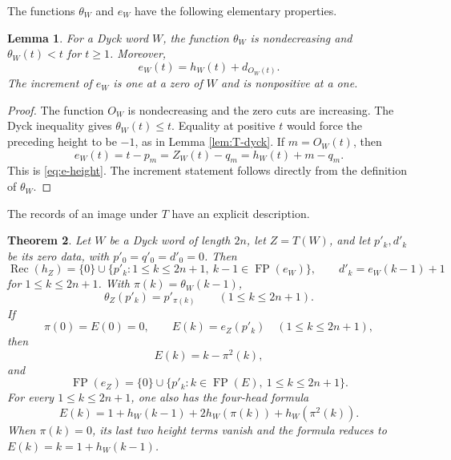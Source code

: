 \documentclass[11pt]{article}
\newtheorem{theorem}{Theorem}[section]
\newtheorem{lemma}[theorem]{Lemma}
\theoremstyle{definition}
\theoremstyle{remark}
\DeclareMathOperator{\Rec}{Rec}
\DeclareMathOperator{\FP}{FP}
\begin{document}
The functions $\theta_W$ and $e_W$ have the following elementary properties.
\begin{lemma}
\label{lem:theta-e}
For a Dyck word \(W\), the function \(\theta_W\) is nondecreasing and
\(\theta_W(t)<t\) for \(t\geq1\).  Moreover,
\begin{equation}
\label{eq:e-height}
 e_W(t)=h_W(t)+d_{O_W(t)}.
\end{equation}
The increment of \(e_W\) is one at a zero of \(W\) and is nonpositive at a
one.
\end{lemma}

\begin{proof}
The function \(O_W\) is nondecreasing and the zero cuts are increasing.  The
Dyck inequality gives \(\theta_W(t)\leq t\).  Equality at positive \(t\)
would force the preceding height to be \(-1\), as in Lemma
\ref{lem:T-dyck}.  If \(m=O_W(t)\), then
\[
 e_W(t)=t-p_m=Z_W(t)-q_m=h_W(t)+m-q_m.
\]
This is \eqref{eq:e-height}.  The increment statement follows directly from
the definition of \(\theta_W\).
\end{proof}

The records of an image under $T$ have an explicit description.
\begin{theorem}
\label{thm:T-records}
Let \(W\) be a Dyck word of length \(2n\), let \(Z=T(W)\), and let
\(p'_k,d'_k\) be its zero data, with \(p'_0=q'_0=d'_0=0\).  Then
\begin{equation}
\label{eq:T-record-set}
 \Rec(h_Z)=\{0\}\cup
 \{p'_k:1\leq k\leq2n+1,\ k-1\in\FP(e_W)\},
 \qquad d'_k=e_W(k-1)+1
\end{equation}
for \(1\leq k\leq2n+1\).
With \(\pi(k)=\theta_W(k-1)\),
\begin{equation}
\label{eq:theta-parent-transport}
 \theta_Z(p'_k)=p'_{\pi(k)}
 \qquad(1\leq k\leq2n+1).
\end{equation}
If
\[
 \pi(0)=E(0)=0,
 \qquad E(k)=e_Z(p'_k)\quad(1\leq k\leq2n+1),
\]
then
\begin{equation}
\label{eq:E-id-pi2}
 E(k)=k-\pi^2(k),
\end{equation}
and
\begin{equation}
\label{eq:FP-eZ}
 \FP(e_Z)=\{0\}\cup
 \{p'_k:k\in\FP(E),\ 1\leq k\leq2n+1\}.
\end{equation}
For every \(1\leq k\leq2n+1\), one also has the four-head formula
\begin{equation}
\label{eq:four-head}
 E(k)=1+h_W(k-1)+2h_W(\pi(k))+h_W(\pi^2(k)).
\end{equation}
When \(\pi(k)=0\), its last two height terms vanish and the formula reduces
to \(E(k)=k=1+h_W(k-1)\).
\end{theorem}
\end{document}
